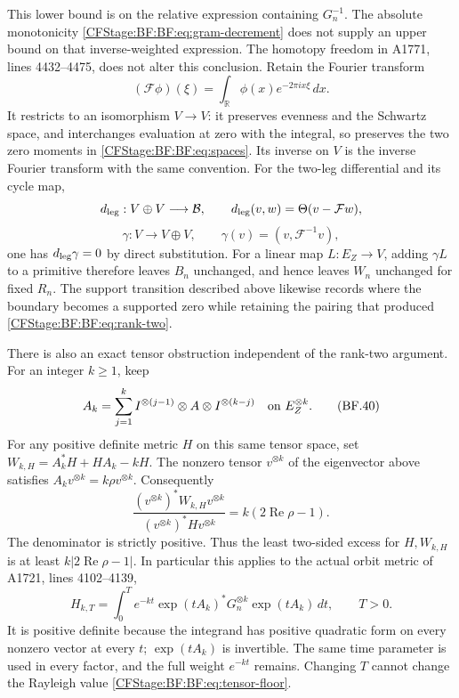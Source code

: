 This lower bound is on the relative expression containing
\(G_n^{-1}\).  The absolute monotonicity
\eqref{CFStage:BF:BF:eq:gram-decrement} does not supply an upper bound on
that inverse-weighted expression.
The homotopy freedom in A1771, lines 4432--4475, does not alter
this conclusion.  Retain the Fourier transform
\[
(\mathcal F\phi)(\xi)
 =\int_{\mathbb R}\phi(x)e^{-2\pi ix\xi}\,dx.
\]
It restricts to an isomorphism \(V\to V\): it preserves evenness
and the Schwartz space, and interchanges evaluation at zero with
the integral, so preserves the two zero moments in
\eqref{CFStage:BF:BF:eq:spaces}.  Its inverse on \(V\) is the inverse Fourier
transform with the same convention.
For the two-leg differential and its cycle map,
\[
d_{\rm leg}:V\oplus V\longrightarrow\mathcal B,\qquad
d_{\rm leg}(v,w)=\Theta(v-\mathcal Fw),
\]
\[
\gamma:V\longrightarrow V\oplus V,\qquad
\gamma(v)=(v,\mathcal F^{-1}v),
\]
one has \(d_{\rm leg}\gamma=0\) by direct substitution.
For a linear map \(L:E_Z\to V\), adding \(\gamma L\) to a
primitive therefore leaves \(B_n\)
unchanged, and hence leaves \(W_n\) unchanged for fixed \(R_n\).
The support transition described above likewise records where
the boundary becomes a supported zero while retaining the
pairing that produced \eqref{CFStage:BF:BF:eq:rank-two}.

There is also an exact tensor obstruction independent of the
rank-two argument.  For an integer \(k\ge1\), keep
\begin{equation}
A_k=\sum_{j=1}^k
 I^{\otimes(j-1)}\otimes A\otimes I^{\otimes(k-j)}
 \quad\hbox{on }E_Z^{\otimes k}.
\tag{BF.40}\label{CFStage:BF:BF:eq:tensor-generator}
\end{equation}
For any positive definite metric \(H\) on this same tensor
space, set \(W_{k,H}=A_k^*H+HA_k-kH\).
The nonzero tensor \(v^{\otimes k}\) of the eigenvector above
satisfies \(A_kv^{\otimes k}=k\rho v^{\otimes k}\).
Consequently
\begin{equation}
\frac{(v^{\otimes k})^*W_{k,H}v^{\otimes k}}
     {(v^{\otimes k})^*H v^{\otimes k}}
 =k(2\operatorname{Re}\rho-1).
\tag{BF.41}\label{CFStage:BF:BF:eq:tensor-floor}
\end{equation}
The denominator is strictly positive.
Thus the least two-sided excess for \(H,W_{k,H}\) is at least
\(k|2\operatorname{Re}\rho-1|\).
In particular this applies to the actual orbit metric of
A1721, lines 4102--4139,
\[
H_{k,T}
 =\int_0^T e^{-kt}\exp(tA_k)^*G_n^{\otimes k}
                       \exp(tA_k)\,dt,\qquad T>0.
\]
It is positive definite because the integrand has positive
quadratic form on every nonzero vector at every \(t\);
\(\exp(tA_k)\) is invertible.
The same time parameter is used in every factor, and the full
weight \(e^{-kt}\) remains.  Changing \(T\) cannot change the
Rayleigh value \eqref{CFStage:BF:BF:eq:tensor-floor}.

